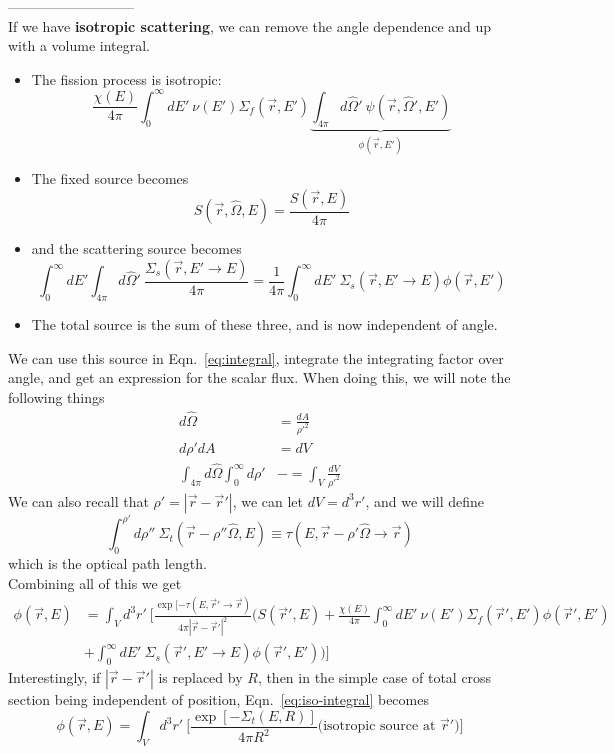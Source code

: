 \documentclass[12pt]{article}
\newcommand{\rvec}{\ensuremath{\vec{r}}}
\newcommand{\vOmega}{\ensuremath{\hat{\Omega}}}
\begin{document}
---------------------------\\
If we have \textbf{isotropic scattering}, we can remove the angle dependence and up with a volume integral.
%
\begin{itemize}
\item The fission process is isotropic:
\[\frac{\chi(E)}{4\pi} \int_0^{\infty} dE' \: \nu(E') \Sigma_f(\rvec, E') \underbrace{\int_{4\pi} d\vOmega' \: \psi(\rvec, \vOmega', E')}_{\phi(\rvec,E')}\]
\item The fixed source becomes
\[S(\rvec, \vOmega, E) = \frac{S(\rvec, E)}{4 \pi}\]
\item and the scattering source becomes
\[\int_0^{\infty} dE' \int_{4\pi} d\vOmega' \: \frac{\Sigma_s(\rvec,E' \rightarrow E)}{4\pi} = \frac{1}{4\pi}\int_0^{\infty} dE'\:\Sigma_s(\rvec,E' \rightarrow E) \phi(\rvec,E')\]
\item The total source is the sum of these three, and is now independent of angle.
\end{itemize}
%
We can use this source in Eqn.~\ref{eq:integral}, integrate the integrating factor over angle, and get an expression for the scalar flux. When doing this, we will note the following things
\begin{align*}
d\vOmega &= \frac{dA}{\rho'^2}\\
d\rho' dA &= dV \\
\int_{4\pi} d\vOmega \int_0^{\infty} d\rho' &-= \int_{V} \frac{dV}{\rho'^2}
\end{align*}
%
We can also recall that $\rho' = |\vec{r} - \vec{r}'|$, we can let $dV = d^3r'$, and we will define
\[\int_0^{\rho'} d\rho'' \: \Sigma_t(\rvec-\rho''\vOmega,E) \equiv \tau(E,\vec{r} - \rho' \vOmega \rightarrow \vec{r})
\]
which is the optical path length. \\
Combining all of this we get
\begin{align}
\phi(\rvec,E) &= \int_V d^3r' \: \biggl[\frac{\exp[-\tau(E,\vec{r}' \rightarrow \vec{r})}{4\pi|\vec{r} - \vec{r}'|^2} \biggl(S(\vec{r}',E) + \frac{\chi(E)}{4\pi} \int_0^{\infty} dE' \: \nu(E') \Sigma_f(\rvec', E')\phi(\vec{r}', E') \nonumber \\
&+ \int_0^{\infty} dE'\:\Sigma_s(\rvec',E' \rightarrow E) \phi(\rvec',E') \biggr)  \biggr]
\label{eq:iso-integral}
\end{align}
%
Interestingly, if $|\vec{r} - \vec{r}'|$ is replaced by $R$, then in the simple case of total cross section being independent of position, Eqn.~\ref{eq:iso-integral} becomes
\[\phi(\rvec,E) = \int_V d^3r' \: \biggl[\frac{\exp[-\Sigma_t(E, R)]}{4\pi R^2} \biggl( \text{isotropic source at }\vec{r}' \biggr)\biggr]\]
\end{document}

